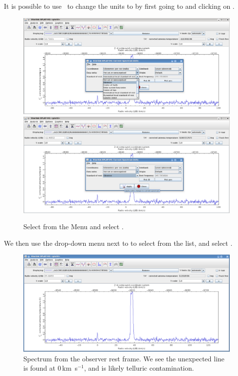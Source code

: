 \documentclass[11pt,oneside,chapters]{starlink}
\newcommand{\kms}{\mbox{$\,$km~s$^{-1}$}}   %
\newcommand{\kms}{\,km~s$^{-1}$}   %
\begin{document}
It is possible to use \splat\ to change the units to 
by first going to  and clicking on .

\begin{figure}[h!]
\begin{center}
\includegraphics[width=0.7\linewidth]{sc20_splat_spectrum_example_telluric3.png}
\includegraphics[width=0.7\linewidth]{sc20_splat_spectrum_example_telluric4.png}
\caption[blah]{\label{fig:telluric3}
  Select  from the  Menu and select
.}
\end{center}
\end{figure}

We then use the drop-down menu next to  to select
 from the list, and select .


\begin{figure}[h!]
\begin{center}
\includegraphics[width=0.7\linewidth]{sc20_splat_spectrum_example_telluric5.png}
\caption[blah]{\label{fig:telluric4}
  Spectrum from the observer rest frame. We see the unexpected line is
  found at 0\kms, and is likely telluric contamination.}
\end{center}
\end{figure}
\end{document}
